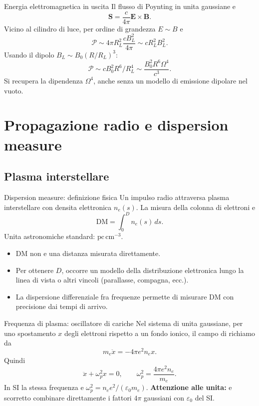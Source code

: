 \begin{frame}[t]{Energia elettromagnetica in uscita}
\small
Il flusso di Poynting in unita gaussiane e
\[
\mathbf S=\frac c{4\pi}\mathbf E\times\mathbf B.
\]
Vicino al cilindro di luce, per ordine di grandezza $E\sim B$ e
\[
\mathcal P\sim4\pi R_L^2\frac{cB_L^2}{4\pi}
\sim cR_L^2B_L^2.
\]
Usando il dipolo $B_L\sim B_0(R/R_L)^3$:
\[
\mathcal P\sim cB_0^2R^6/R_L^4
\sim\frac{B_0^2R^6\Omega^4}{c^3}.
\]
Si recupera la dipendenza $\Omega^4$, anche senza un modello di emissione dipolare nel vuoto.
\end{frame}

\section{Propagazione radio e dispersion measure}

\subsection{Plasma interstellare}

\begin{frame}[t]{Dispersion measure: definizione fisica}
\small
Un impulso radio attraversa plasma interstellare con densita elettronica $n_e(s)$.
La misura della colonna di elettroni e
\[
\mathrm{DM}=\int_0^D n_e(s)\,ds.
\]
Unita astronomiche standard: $\mathrm{pc\,cm^{-3}}$.
\begin{itemize}
\item DM non e una distanza misurata direttamente.
\item Per ottenere $D$, occorre un modello della distribuzione elettronica lungo la linea di vista o altri vincoli (parallasse, compagna, ecc.).
\item La dispersione differenziale fra frequenze permette di misurare DM con precisione dai tempi di arrivo.
\end{itemize}
\end{frame}

\begin{frame}[t]{Frequenza di plasma: oscillatore di cariche}
\small
Nel sistema di unita gaussiane, per uno spostamento $x$ degli elettroni rispetto a un fondo ionico, il campo di richiamo da
\[
m_e\ddot x=-4\pi e^2n_e x.
\]
Quindi
\[
\ddot x+\omega_p^2 x=0,\qquad
\omega_p^2=\frac{4\pi e^2n_e}{m_e}.
\]
In SI la stessa frequenza e $\omega_p^2=n_e e^2/(\varepsilon_0m_e)$.
\medskip
\textbf{Attenzione alle unita:} e scorretto combinare direttamente i fattori $4\pi$ gaussiani con $\varepsilon_0$ del SI.
\end{frame}

